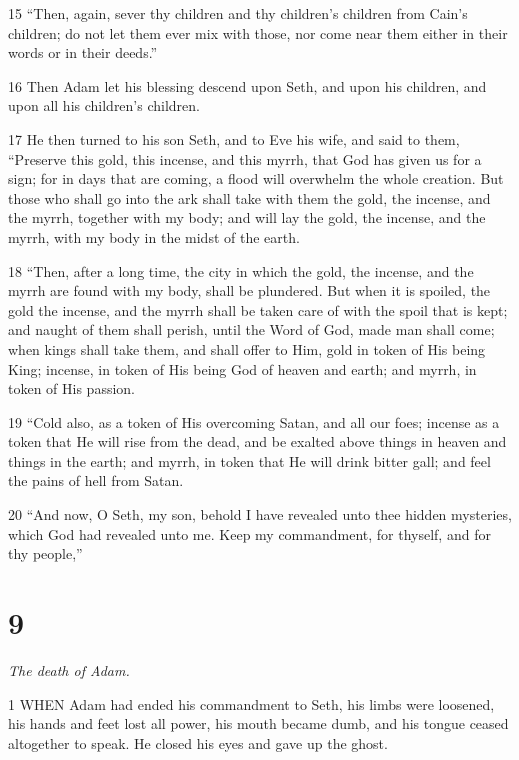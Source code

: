 \par 15 “Then, again, sever thy children and thy children's children from Cain's children; do not let them ever mix with those, nor come near them either in their words or in their deeds.”

\par 16 Then Adam let his blessing descend upon Seth, and upon his children, and upon all his children's children.

\par 17 He then turned to his son Seth, and to Eve his wife, and said to them, “Preserve this gold, this incense, and this myrrh, that God has given us for a sign; for in days that are coming, a flood will overwhelm the whole creation. But those who shall go into the ark shall take with them the gold, the incense, and the myrrh, together with my body; and will lay the gold, the incense, and the myrrh, with my body in the midst of the earth.

\par 18 “Then, after a long time, the city in which the gold, the incense, and the myrrh are found with my body, shall be plundered. But when it is spoiled, the gold the incense, and the myrrh shall be taken care of with the spoil that is kept; and naught of them shall perish, until the Word of God, made man shall come; when kings shall take them, and shall offer to Him, gold in token of His being King; incense, in token of His being God of heaven and earth; and myrrh, in token of His passion.

\par 19 “Cold also, as a token of His overcoming Satan, and all our foes; incense as a token that He will rise from the dead, and be exalted above things in heaven and things in the earth; and myrrh, in token that He will drink bitter gall; and feel the pains of hell from Satan.

\par 20 “And now, O Seth, my son, behold I have revealed unto thee hidden mysteries, which God had revealed unto me. Keep my commandment, for thyself, and for thy people,”

\chapter{9}

\par \textit{The death of Adam.}

\par 1 WHEN Adam had ended his commandment to Seth, his limbs were loosened, his hands and feet lost all power, his mouth became dumb, and his tongue ceased altogether to speak. He closed his eyes and gave up the ghost.

